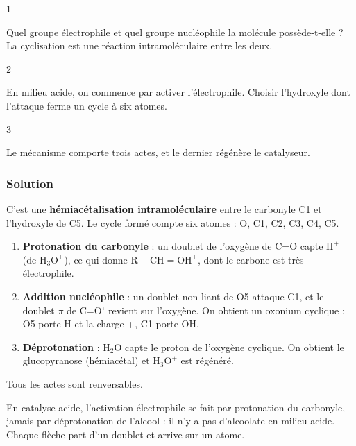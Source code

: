 \documentclass[11pt,a4paper]{article}
\providecommand{\tightlist}{\setlength{\itemsep}{0pt}\setlength{\parskip}{0pt}}
\begin{document}
\begin{indication}{1}

Quel groupe électrophile et quel groupe nucléophile la molécule possède-t-elle ? La cyclisation est une réaction intramoléculaire entre les deux.

\end{indication}

\begin{indication}{2}

En milieu acide, on commence par activer l'électrophile. Choisir l'hydroxyle dont l'attaque ferme un cycle à six atomes.

\end{indication}

\begin{indication}{3}

Le mécanisme comporte trois actes, et le dernier régénère le catalyseur.

\end{indication}

\hypertarget{solution-2}{%
\subsubsection{Solution}\label{solution-2}}

C'est une \textbf{hémiacétalisation intramoléculaire} entre le carbonyle C1 et l'hydroxyle de C5. Le cycle formé compte six atomes : O, C1, C2, C3, C4, C5.

\begin{enumerate}
\def\labelenumi{\arabic{enumi}.}
\tightlist
\item
  \textbf{Protonation du carbonyle} : un doublet de l'oxygène de C=O capte \(\mathrm{H^+}\) (de \(\mathrm{H_3O^+}\)), ce qui donne \(\mathrm{R{-}CH{=}OH^+}\), dont le carbone est très électrophile.
\item
  \textbf{Addition nucléophile} : un doublet non liant de O5 attaque C1, et le doublet \(\pi\) de C=O⁺ revient sur l'oxygène. On obtient un oxonium cyclique : O5 porte H et la charge +, C1 porte OH.
\item
  \textbf{Déprotonation} : \(\mathrm{H_2O}\) capte le proton de l'oxygène cyclique. On obtient le glucopyranose (hémiacétal) et \(\mathrm{H_3O^+}\) est régénéré.
\end{enumerate}

Tous les actes sont renversables.

\begin{methode}

En catalyse acide, l'activation électrophile se fait par protonation du carbonyle, jamais par déprotonation de l'alcool : il n'y a pas d'alcoolate en milieu acide. Chaque flèche part d'un doublet et arrive sur un atome.

\end{methode}
\end{document}
